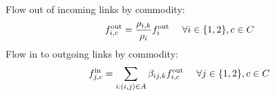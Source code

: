 	\indent \indent  Flow out of incoming links by commodity:
	\[
	\flowoutmcnt{i}{k}{c} = \frac{\densitymcnt{i}{k}{c}}{\densitynt{i}{k}}\flowoutnt{i}{k} \ \ \ \ \forall{i\in\{1,2\}, c\in C}
	\]
	\indent \indent  Flow in to outgoing links by commodity:
	\[
	\flowinmcnt{j}{k}{c} = \sum_{i:(i,j)\in A} \splitrationt{i}{j}{k}{c} \flowoutmcnt{i}{k}{c} \ \ \ \ \forall{j\in\{1,2\}, c\in C}
	\]








